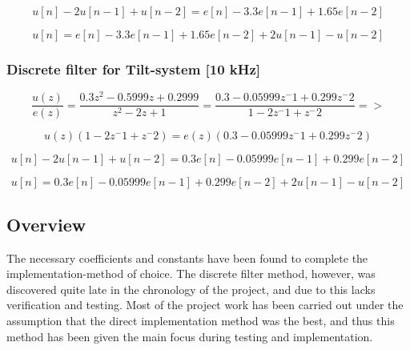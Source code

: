 \begin{equation}
u[n]-2u[n-1]+u[n-2]=e[n]-3.3e[n-1]+1.65e[n-2]
\end{equation}

\begin{equation}
u[n]=e[n]-3.3e[n-1]+1.65e[n-2]+2u[n-1]-u[n-2]
\end{equation}

\subsubsection{Discrete filter for Tilt-system [10 kHz]}

\begin{equation}
\frac{u(z)}{e(z)}=\frac{0.3z^2-0.5999z+0.2999}{z^2-2z+1}=\frac{0.3-0.05999z^-1+0.299z^-2}{1-2z^-1+z^-2} =>
\end{equation}

\begin{equation}
u(z)(1-2z^-1+z^-2)=e(z)(0.3-0.05999z^-1+0.299z^-2)
\end{equation}

\begin{equation}
u[n]-2u[n-1]+u[n-2]=0.3e[n]-0.05999e[n-1]+0.299e[n-2]
\end{equation}

\begin{equation}
u[n]=0.3e[n]-0.05999e[n-1]+0.299e[n-2]+2u[n-1]-u[n-2]
\end{equation}

\subsection{Overview}
The necessary coefficients and constants have been found to complete the implementation-method of choice. The discrete filter method, however, was discovered quite late in the chronology of the project, and due to this lacks verification and testing. Most of the project work has been carried out under the assumption that the direct implementation method was the best, and thus this method has been given the main focus during testing and implementation.